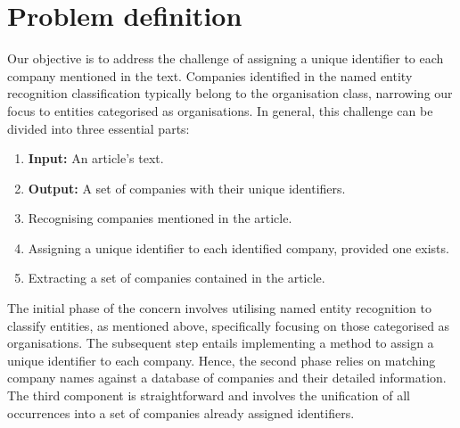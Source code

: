 \section{Problem definition}
\label{sec:problem-definition}
Our objective is to address the challenge of assigning a unique identifier to each company mentioned in the text. Companies identified in the named entity recognition classification typically belong to the organisation class, narrowing our focus to entities categorised as organisations. In general, this challenge can be divided into three essential parts:

\begin{enumerate}
    \item[] \textbf{Input:} An article's text.
    \item[] \textbf{Output:} A set of companies with their unique identifiers.
    \item Recognising companies mentioned in the article.
    \item Assigning a unique identifier to each identified company, provided one exists.
    \item Extracting a set of companies contained in the article.
\end{enumerate}

The initial phase of the concern involves utilising named entity recognition to classify entities, as mentioned above, specifically focusing on those categorised as organisations. The subsequent step entails implementing a method to assign a unique identifier to each company. Hence, the second phase relies on matching company names against a database of companies and their detailed information. The third component is straightforward and involves the unification of all occurrences into a set of companies already assigned identifiers.

